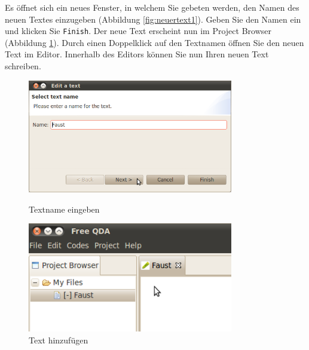 Es öffnet sich ein neues Fenster, in welchem Sie gebeten werden, den Namen des neuen Textes einzugeben (Abbildung \ref{fig:neuertext1}). %
Geben Sie den Namen ein und klicken Sie \texttt{Finish}. Der neue Text erscheint nun im Project Browser (Abbildung \ref{fig:neuertext2}). 
Durch einen Doppelklick auf den Textnamen öffnen Sie den neuen Text im Editor. Innerhalb des Editors können Sie nun Ihren neuen Text %
schreiben. 
\begin{figure}[!hbt]
\begin{minipage}[!hb!]{0.5\textwidth}
	\centering
	 \includegraphics[width=0.8\textwidth]{img/NexText}
	\caption{Textname eingeben}
	\label{fig:neuertext1}
\end{minipage}
\hfill
\begin{minipage}[!hb!]{0.5\textwidth}
	\centering
	 \includegraphics[width=0.8\textwidth]{img/NewText2}
	\caption{Text hinzufügen}
	\label{fig:neuertext2}
\end{minipage}
\end{figure}

